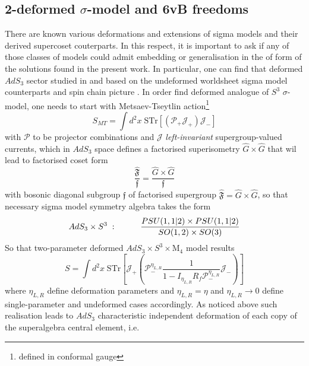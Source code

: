 \documentclass[12pt,a4paper]{article}
\numberwithin{equation}{section}
\begin{document}
\subsection{2-deformed $ \sigma $-model and 6vB freedoms}
There are known various deformations and extensions of sigma models and their derived supercoset couterparts. In this respect, it is important to ask if any of those classes of models could admit embedding or generalisation in the of form of the solutions found in the present work. In particular, one can find that deformed $ AdS_{3} $ sector studied in \cite{Hoare:2014oua} and based on the undeformed worldsheet sigma model counterparts \cite{Klimcik:2008eq,Delduc_2013,Klim_k_2014} and spin chain picture \cite{Sax_2011,sax2013massless}. In order find deformed analogue of $ S^{3} $ $ \sigma $-model, one needs to start with Metsaev-Tseytlin action\footnote{defined in conformal gauge} \cite{Metsaev:1998it}
\begin{equation}
	 S _{MT} = \int d^{2}x \; \text{STr}\left[ \left( \mathcal{P}_{+}\mathcal{J}_{+} \right) \mathcal{J}_{-} \right]
\end{equation}
with $ \mathcal{P} $ to be projector combinations and $ \mathcal{J} $ \textit{left-invariant} supergroup-valued currents, which in $ AdS_{3} $ space defines a factorised superisometry $ \hat{G} \times \hat{G} $ that wil lead to factorised coset form
\begin{equation}\label{key}
	\dfrac{\hat{\mathfrak{F}}}{\mathfrak{f}} = \dfrac{\hat{G} \times \hat{G}}{\mathfrak{f}} 
\end{equation}
with bosonic diagonal subgroup $ \mathfrak{f} $ of factorised supergroup $ \hat{\mathfrak{F}} = \hat{G} \times \hat{G} $, so that necessary sigma model symmetry algebra takes the form
\begin{equation}\label{key}
		AdS_{3} \times S^{3} \;: \hspace{10mm} \dfrac{PSU(1,1\vert2) \times PSU(1,1\vert2)}{SO(1,2) \times SO(3)}
\end{equation}
So that two-parameter deformed $ AdS_{3} \times S^{3} \times \mathrm{M}_{4} $ model \cite{Hoare:2014oua} results
\begin{equation}\label{key}
	S = \int d^{2}x \; \text{STr} \left[ \mathcal{J}_{+} \left( \mathcal{P}_{-}^{\eta_{L,R}} \dfrac{1}{1-I_{\eta_{L,R}} R_{f} \mathcal{P}_{-}^{\eta_{L,R}}} \mathcal{J}_{-} \right) \right]
\end{equation}
where $ \eta_{L,R} $ define deformation parameters and $ \eta_{L,R} = \eta $ and $ \eta_{L,R} \rightarrow 0 $ define single-parameter \cite{Delduc_2013} and undeformed cases accordingly. As noticed above such realisation leads to $ AdS_{3} $ characteristic independent deformation of each copy of the superalgebra central element, i.e.
\end{document}
